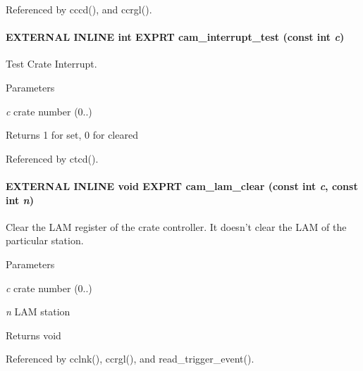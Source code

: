 Referenced by cccd(), and ccrgl().
\paragraph[{cam\_\-interrupt\_\-test}]{\setlength{\rightskip}{0pt plus 5cm}EXTERNAL INLINE int EXPRT cam\_\-interrupt\_\-test (const int {\em c})}\hfill\label{group__mcstdfunctionh_ga2d49cca206c1483a05bf5d13c37ae48a}
Test Crate Interrupt. 
\begin{DoxyParams}{Parameters}
\item[{\em c}]crate number (0..) \end{DoxyParams}
\begin{DoxyReturn}{Returns}
1 for set, 0 for cleared 
\end{DoxyReturn}


Referenced by ctcd().
\paragraph[{cam\_\-lam\_\-clear}]{\setlength{\rightskip}{0pt plus 5cm}EXTERNAL INLINE void EXPRT cam\_\-lam\_\-clear (const int {\em c}, \/  const int {\em n})}\hfill\label{group__mcstdfunctionh_ga1ec1e961fe6664de573a78181b2f111c}
Clear the LAM register of the crate controller. It doesn't clear the LAM of the particular station. 
\begin{DoxyParams}{Parameters}
\item[{\em c}]crate number (0..) \item[{\em n}]LAM station \end{DoxyParams}
\begin{DoxyReturn}{Returns}
void 
\end{DoxyReturn}


Referenced by cclnk(), ccrgl(), and read\_\-trigger\_\-event().
